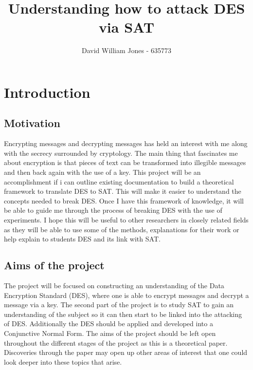 \documentclass[11pt,a4paper]{report}
\begin{document}
\title{Understanding how to attack DES via SAT}
\author{David William Jones - 635773}

\maketitle
\tableofcontents

\chapter{Introduction}
\label{cha:Introduction}

\section{Motivation}
\label{cha:Motivation}

Encrypting messages and decrypting messages has held an interest with me along with the secrecy surrounded by cryptology. The main thing that fascinates me about encryption is that pieces of text can be transformed into illegible messages and then back again with the use of a key. This project will be an accomplishment if i can outline existing documentation to build a theoretical framework to translate DES to SAT. This will make it easier to understand the concepts needed to break DES. Once I have this framework of knowledge, it will be able to guide me through the process of breaking DES with the use of experiments. I hope this will be useful to other researchers in closely related fields as they will be able to use some of the methods, explanations for their work or help explain to students DES and its link with SAT. 



\section{Aims of the project}
\label{cha:Aims}

The project will be focused on constructing an understanding of the Data Encryption Standard (DES), where one is able to encrypt messages and decrypt a message via a key. The second part of the project is to study SAT to gain an understanding of the subject so it can then start to be linked into the attacking of DES. Additionally the DES should be applied and developed into a Conjunctive Normal Form.
The aims of the project should be left open throughout the different stages of the project as this is a theoretical paper. Discoveries through the paper may open up other areas of interest that one could look deeper into these topics that arise.
\end{document}
